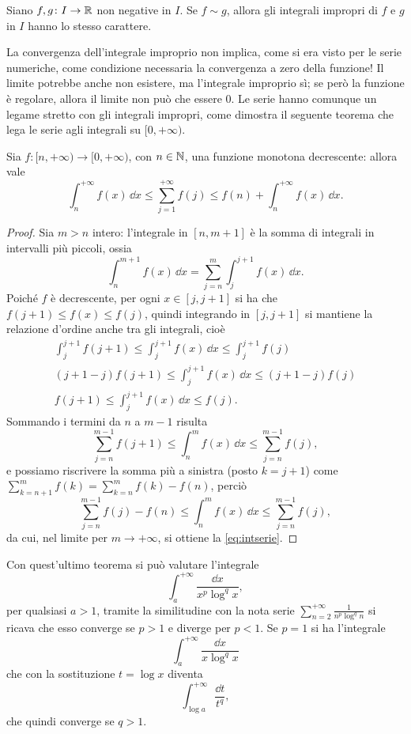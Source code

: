 \begin{corollario} \label{t:confronto_asintotico_int}
Siano $f,g\colon I\to\mathbb{R}$ non negative in $I$. Se $f\sim g$, allora gli integrali impropri di $f$ e $g$ in $I$ hanno lo stesso carattere.
\end{corollario}
La convergenza dell'integrale improprio non implica, come si era visto per le serie numeriche, come condizione necessaria la convergenza a zero della funzione! Il limite potrebbe anche non esistere, ma l'integrale improprio sì; se però la funzione è regolare, allora il limite non può che essere 0. Le serie hanno comunque un legame stretto con gli integrali impropri, come dimostra il seguente teorema che lega le serie agli integrali su $[0,+\infty)$.
\begin{teorema} \label{t:intserie}
	Sia $f\colon[n,+\infty)\to[0,+\infty)$, con $n\in\mathbb{N}$, una funzione monotona decrescente: allora vale
	\begin{equation} \label{eq:intserie}
		\int_n^{+\infty} f(x)\,\dd x\leq\sum_{j=1}^{+\infty}f(j)\leq f(n)+\int_n^{+\infty} f(x)\,\dd x.
	\end{equation}
\end{teorema}
\begin{proof}
	Sia $m>n$ intero: l'integrale in $[n,m+1]$ è la somma di integrali in intervalli più piccoli, ossia
	\begin{equation}
		\int_n^{m+1}f(x)\,\dd x=\sum_{j=n}^{m}\int_j^{j+1}f(x)\,\dd x.
	\end{equation}
	Poiché $f$ è decrescente, per ogni $x\in[j,j+1]$ si ha che $f(j+1)\leq f(x)\leq f(j)$, quindi integrando in $[j,j+1]$ si mantiene la relazione d'ordine anche tra gli integrali, cioè
	\begin{gather*}
		\int_j^{j+1}f(j+1)\leq\int_j^{j+1}f(x)\,\dd x\leq\int_j^{j+1}f(j)\\
		(j+1-j)f(j+1)\leq\int_j^{j+1}f(x)\,\dd x\leq(j+1-j)f(j)\\
		f(j+1)\leq\int_j^{j+1}f(x)\,\dd x\leq f(j).
	\end{gather*}
	Sommando i termini da $n$ a $m-1$ risulta
	\begin{equation}
		\sum_{j=n}^{m-1}f(j+1)\leq\int_n^m f(x)\,\dd x\leq\sum_{j=n}^{m-1}f(j),
	\end{equation}
	e possiamo riscrivere la somma più a sinistra (posto $k=j+1$) come $\sum_{k=n+1}^mf(k)=\sum_{k=n}^mf(k)-f(n)$, perciò
	\begin{equation}
		\sum_{j=n}^{m-1}f(j)-f(n)\le\int_n^m f(x)\,\dd x\le\sum_{j=n}^{m-1}f(j),
	\end{equation}
	da cui, nel limite per $m\to+\infty$, si ottiene la \eqref{eq:intserie}.
\end{proof}
\begin{esempio} \label{es:integrale-campione}
	Con quest'ultimo teorema si può valutare l'integrale
	\[
	\int_a^{+\infty}\frac{\dd x}{x^p\log^qx},
	\]
	per qualsiasi $a>1$, tramite la similitudine con la nota serie $\sum_{n=2}^{+\infty}\frac1{n^p\log^qn}$ si ricava che esso converge se $p>1$ e diverge per $p<1$. Se $p=1$ si ha l'integrale
	\[
	\int_a^{+\infty}\frac{\dd x}{x\log^qx}
	\]
	che con la sostituzione $t=\log x$ diventa
	\[
	\int_{\log a}^{+\infty}\frac{\dd t}{t^q},
	\]
	che quindi converge se $q>1$.
\end{esempio}
